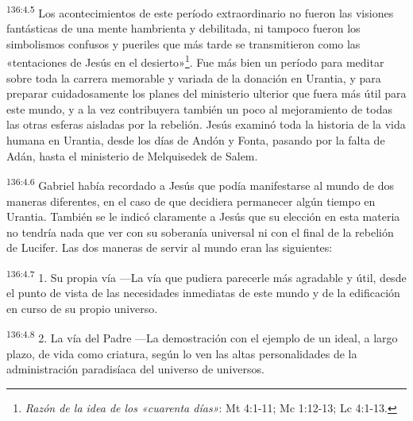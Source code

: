 \par 
\textsuperscript{136:4.5} Los acontecimientos de este período extraordinario no fueron las visiones fantásticas de una mente hambrienta y debilitada, ni tampoco fueron los simbolismos confusos y pueriles que más tarde se transmitieron como las «tentaciones de Jesús en el desierto»\footnote{\textit{Razón de la idea de los «cuarenta días»}: Mt 4:1-11; Mc 1:12-13; Lc 4:1-13.}. Fue más bien un período para meditar sobre toda la carrera memorable y variada de la donación en Urantia, y para preparar cuidadosamente los planes del ministerio ulterior que fuera más útil para este mundo, y a la vez contribuyera también un poco al mejoramiento de todas las otras esferas aisladas por la rebelión. Jesús examinó toda la historia de la vida humana en Urantia, desde los días de Andón y Fonta, pasando por la falta de Adán, hasta el ministerio de Melquisedek de Salem.

\par 
\textsuperscript{136:4.6} Gabriel había recordado a Jesús que podía manifestarse al mundo de dos maneras diferentes, en el caso de que decidiera permanecer algún tiempo en Urantia. También se le indicó claramente a Jesús que su elección en esta materia no tendría nada que ver con su soberanía universal ni con el final de la rebelión de Lucifer. Las dos maneras de servir al mundo eran las siguientes:

\par 
\textsuperscript{136:4.7} 1. Su propia vía ---La vía que pudiera parecerle más agradable y útil, desde el punto de vista de las necesidades inmediatas de este mundo y de la edificación en curso de su propio universo.

\par 
\textsuperscript{136:4.8} 2. La vía del Padre ---La demostración con el ejemplo de un ideal, a largo plazo, de vida como criatura, según lo ven las altas personalidades de la administración paradisíaca del universo de universos.

